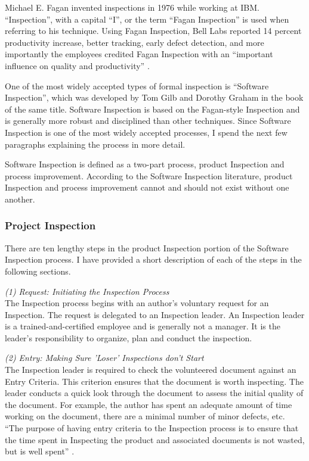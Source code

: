 Michael E. Fagan invented inspections in 1976 while working at IBM.
``Inspection'', with a capital ``I'', or the term ``Fagan Inspection'' is
used when referring to his technique. Using Fagan Inspection, Bell Labs
reported 14 percent productivity increase, better tracking, early defect
detection, and more importantly the employees credited Fagan Inspection
with an ``important influence on quality and productivity'' \cite{Gilb93}.

One of the most widely accepted types of formal inspection is ``Software
Inspection'', which was developed by Tom Gilb and Dorothy Graham
\cite{Gilb93} in the book of the same title. Software Inspection is based
on the Fagan-style Inspection and is generally more robust and disciplined
than other techniques. Since Software Inspection is one of the most widely
accepted processes, I spend the next few paragraphs explaining the process
in more detail.

Software Inspection is defined as a two-part process, product Inspection
and process improvement. According to the Software Inspection literature,
product Inspection and process improvement cannot and should not exist
without one another.

\subsubsection{Project Inspection}
There are ten lengthy steps in the product Inspection portion of the
Software Inspection process. I have provided a short description of each of
the steps in the following sections.

\begin{flushleft}
  \textit{(1) Request: Initiating the Inspection Process} \\ The
  Inspection process begins with an author's voluntary request for an
  Inspection. The request is delegated to an Inspection leader. An
  Inspection leader is a trained-and-certified employee and is generally
  not a manager. It is the leader's responsibility to organize, plan and
  conduct the inspection.
\end{flushleft}

\begin{flushleft}
  \textit{(2) Entry: Making Sure 'Loser' Inspections don't Start} \\ The
  Inspection leader is required to check the volunteered document against
  an Entry Criteria. This criterion ensures that the document is worth
  inspecting. The leader conducts a quick look through the document to
  assess the initial quality of the document. For example, the author has
  spent an adequate amount of time working on the document, there are a
  minimal number of minor defects, etc. ``The purpose of having entry
  criteria to the Inspection process is to ensure that the time spent in
  Inspecting the product and associated documents is not wasted, but is
  well spent'' \cite{Gilb93}.
\end{flushleft}

